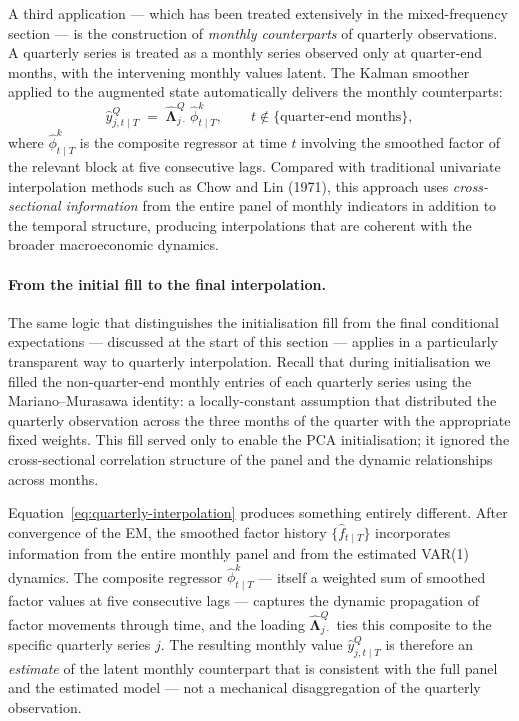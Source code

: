 \documentclass[11pt, a4paper, oneside]{article}
\newcommand{\mL}{\boldsymbol{\Lambda}}
\begin{document}
A third application — which has been treated extensively in the
mixed-frequency section — is the construction of \emph{monthly
counterparts} of quarterly observations. A quarterly series is
treated as a monthly series observed only at quarter-end months,
with the intervening monthly values latent. The Kalman smoother
applied to the augmented state automatically delivers the monthly
counterparts:
\begin{equation}
\hat{y}^Q_{j, t \mid T}
\;=\; \hat{\mL}^{Q}_{j \cdot}\, \hat{\phi}^k_{t \mid T},
\qquad t \notin \{\text{quarter-end months}\},
\label{eq:quarterly-interpolation}
\end{equation}
where $\hat{\phi}^k_{t \mid T}$ is the composite regressor at time
$t$ involving the smoothed factor of the relevant block at five
consecutive lags. Compared with traditional univariate interpolation
methods such as Chow and Lin (1971), this approach uses
\emph{cross-sectional information} from the entire panel of monthly
indicators in addition to the temporal structure, producing
interpolations that are coherent with the broader macroeconomic
dynamics.

\paragraph{From the initial fill to the final interpolation.}
The same logic that distinguishes the initialisation fill from the
final conditional expectations — discussed at the start of this
section — applies in a particularly transparent way to quarterly
interpolation. Recall that during initialisation we filled the
non-quarter-end monthly entries of each quarterly series using the
Mariano--Murasawa identity: a locally-constant assumption that
distributed the quarterly observation across the three months of
the quarter with the appropriate fixed weights. This fill served
only to enable the PCA initialisation; it ignored the
cross-sectional correlation structure of the panel and the dynamic
relationships across months.

Equation~\eqref{eq:quarterly-interpolation} produces something
entirely different. After convergence of the EM, the smoothed
factor history $\{\hat{f}_{t \mid T}\}$ incorporates information
from the entire monthly panel and from the estimated VAR(1)
dynamics. The composite regressor $\hat{\phi}^k_{t \mid T}$ —
itself a weighted sum of smoothed factor values at five consecutive
lags — captures the dynamic propagation of factor movements
through time, and the loading $\hat{\mL}^Q_{j \cdot}$ ties this
composite to the specific quarterly series $j$. The resulting
monthly value $\hat{y}^Q_{j, t \mid T}$ is therefore an
\emph{estimate} of the latent monthly counterpart that is
consistent with the full panel and the estimated model — not a
mechanical disaggregation of the quarterly observation.
\end{document}

